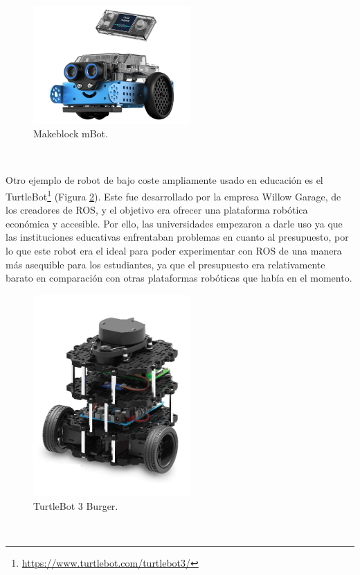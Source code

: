 \begin{figure} [H]
  \begin{center}
    \includegraphics[width=6cm]{figs/mbot-2.jpg}
  \end{center}
  \caption{Makeblock mBot.}
  \label{fig:mbot-2}
\end{figure}\


Otro ejemplo de robot de bajo coste ampliamente usado en educación es el TurtleBot\footnote{\url{https://www.turtlebot.com/turtlebot3/}} (Figura \ref{fig:turtlebot}). Este fue desarrollado por la empresa Willow Garage, de los creadores de ROS, y el objetivo era ofrecer una plataforma robótica económica y accesible. Por ello, las universidades empezaron a darle uso ya que las instituciones educativas enfrentaban problemas en cuanto al presupuesto, por lo que este robot era el ideal para poder experimentar con ROS de una manera más asequible para los estudiantes, ya que el presupuesto era relativamente barato en comparación con otras plataformas robóticas que había en el momento.

\begin{figure} [H]
  \begin{center}
    \includegraphics[width=6cm]{figs/turtlebot3burguer.jpg}
  \end{center}
  \caption{TurtleBot 3 Burger.}
  \label{fig:turtlebot}
\end{figure}\


